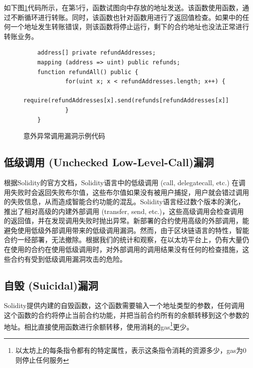 如下图\ref{fig:revert_vul}代码所示，在第5行，函数试图向中存放的地址发送。该函数使用函数，通过不断循环进行转账。同时，该函数也针对函数用进行了返回值检查。如果中的任何一个地址发生转账错误，则该函数将停止运行，剩下的合约地址也没法正常进行转账业务。

\begin{figure}
\begin{minipage}[htb]{1.0\linewidth}
    \begin{lstlisting}
    address[] private refundAddresses;
    mapping (address => uint) public refunds;
    function refundAll() public {
            for(uint x; x < refundAddresses.length; x++) {
                require(refundAddresses[x].send(refunds[refundAddresses[x]]));
            }
    }
    \end{lstlisting}
\end{minipage}
\vspace{-5mm}
\caption{意外异常调用漏洞示例代码}
\label{fig:revert_vul}
\end{figure}


\subsection{低级调用 (Unchecked Low-Level-Call)漏洞}

根据Solidity的官方文档\cite{solidity-doc}，Solidity语言中的低级调用 (call, delegatecall, etc.) 在调用失败时会返回失败布尔值，这些布尔值如果没有被用户捕捉，用户就会错过调用的失败信息，从而造成智能合约功能的混乱。Solidity语言经过数个版本的演化，推出了相对高级的内建外部调用 (transfer, send, etc.)，这些高级调用会检查调用的返回值，并在发现调用失败时抛出异常。新部署的合约使用高级的外部调用，能避免使用低级外部调用带来的低级调用漏洞。然而，由于区块链语言的特性，智能合约一经部署，无法撤除。根据我们的统计和观察，在以太坊平台上，仍有大量仍在使用的合约在使用低级调用时，对外部调用的调用结果没有任何的检查措施，这些合约有受到低级调用漏洞攻击的危险。

\subsection{自毁 (Suicidal)漏洞}

Solidity提供内建的自毁函数，这个函数需要输入一个地址类型的参数，任何调用这个函数的合约将停止当前合约功能，并把当前合约所有的余额转移到这个参数的地址。相比直接使用函数进行余额转移，使用消耗的gas\footnote{以太坊上的每条指令都有的特定属性，表示这条指令消耗的资源多少，gas为0则停止任何服务}更少。

